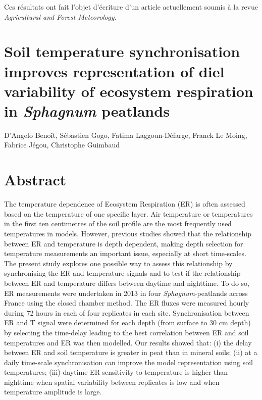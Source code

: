 Ces résultats ont fait l'objet d'écriture d'un article actuellement soumis à la revue \textit{Agricultural and Forest Meteorology}.

\singlespacing
\section*{Soil temperature synchronisation improves representation of diel variability of ecosystem respiration in \textit{Sphagnum} peatlands}
\doublespacing

{\large D'Angelo Benoît, Sébastien Gogo, Fatima Laggoun-Défarge, Franck Le Moing, Fabrice Jégou, Christophe Guimbaud}

\section{Abstract}

The temperature dependence of Ecosystem Respiration (ER) is often assessed based on the temperature of one specific layer.
Air temperature or temperatures in the first ten centimetres of the soil profile are the most frequently used temperatures in models.
However, previous studies showed that the relationship between ER and temperature is depth dependent, making depth selection for temperature measurements an important issue, especially at short time-scales.
The present study explores one possible way to assess this relationship by synchronising the ER and temperature signals and to test if the relationship between ER and temperature differs between daytime and nighttime.
To do so, ER measurements were undertaken in 2013 in four \textit{Sphagnum}-peatlands across France using the closed chamber method. 
The ER fluxes were measured hourly during 72 hours in each of four replicates in each site.
Synchronisation between ER and T signal were determined for each depth (from surface to 30 cm depth) by selecting the time-delay leading to the best correlation between ER and soil temperatures and ER was then modelled.
Our results showed that: (i) the delay between ER and soil temperature is greater in peat than in mineral soils; (ii) at a daily time-scale synchronisation can improve the model representation using soil temperatures; (iii) daytime ER sensitivity to temperature is higher than nighttime when spatial variability between replicates is low and when temperature amplitude is large.

